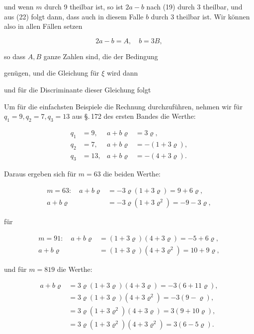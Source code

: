 
und wenn $m$ durch 9 theilbar ist, so ist $2a - b$ nach (19) durch 3
theilbar, und aus (22) folgt dann, dass auch in diesem Falle $b$ durch 3
theilbar ist. Wir können also in allen Fällen setzen

\[ 2a - b = A, \quad b = 3B, \]

so dass $A, B$ ganze Zahlen sind, die der Bedingung


genügen, und die Gleichung für $\xi$ wird dann


und für die Discriminante dieser Gleichung folgt


Um für die einfachsten Beispiele die Rechnung durchzuführen, nehmen wir für
$q_1 = 9, q_2 = 7, q_3 = 13$ aus \S.\,172 des ersten Bandes die Werthe:

\[ \begin{aligned}
q_1 &= 9, & a + b\varrho &= 3\varrho, \\
q_2 &= 7, & a + b\varrho &= -(1 + 3\varrho), \\
q_3 &= 13, & a + b\varrho &= -(4 + 3\varrho).
\end{aligned} \]

Daraus ergeben sich für $m = 63$ die beiden Werthe:

\[ \begin{aligned}
m = 63:\quad a + b\varrho &= -3\varrho(1 + 3\varrho) = 9 + 6\varrho, \\
a + b\varrho &= -3\varrho(1 + 3\varrho^2) = -9 - 3\varrho,
\end{aligned} \]

für

\[ \begin{aligned}
m = 91:\quad a + b\varrho &= (1 + 3\varrho)(4 + 3\varrho) = -5 + 6\varrho, \\
a + b\varrho &= (1 + 3\varrho)(4 + 3\varrho^2) = 10 + 9\varrho,
\end{aligned} \]

und für $m = 819$ die Werthe:

\[ \begin{aligned}
a + b\varrho &= 3\varrho(1 + 3\varrho)(4 + 3\varrho) = -3(6 + 11\varrho), \\
&= 3\varrho(1 + 3\varrho)(4 + 3\varrho^2) = -3(9 - \varrho), \\
&= 3\varrho(1 + 3\varrho^2)(4 + 3\varrho) = 3(9 + 10\varrho), \\
&= 3\varrho(1 + 3\varrho^2)(4 + 3\varrho^2) = 3(6 - 5\varrho).
\end{aligned} \]

